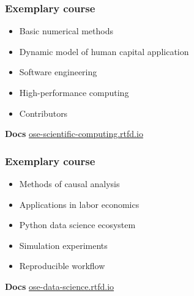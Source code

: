 \begin{frame}\frametitle{Exemplary course}

	\vspace{0.3cm}\vspace{0.3cm}

	\begin{itemize}\setlength\itemsep{1em}
\item Basic numerical methods
\item Dynamic model of human capital application
\item Software engineering
\item High-performance computing
\item Contributors
\end{itemize}

\textbf{Docs}\hspace{0.25cm} \url{ose-scientific-computing.rtfd.io}

\end{frame}
\begin{frame}\frametitle{Exemplary course}

	\vspace{0.3cm}\vspace{0.3cm}

	\begin{itemize}\setlength\itemsep{1em}
\item Methods of causal analysis
\item Applications in labor economics
\item Python data science ecosystem
\item Simulation experiments
\item Reproducible workflow
\end{itemize}

\textbf{Docs}\hspace{0.25cm} \url{ose-data-science.rtfd.io}

\end{frame}
